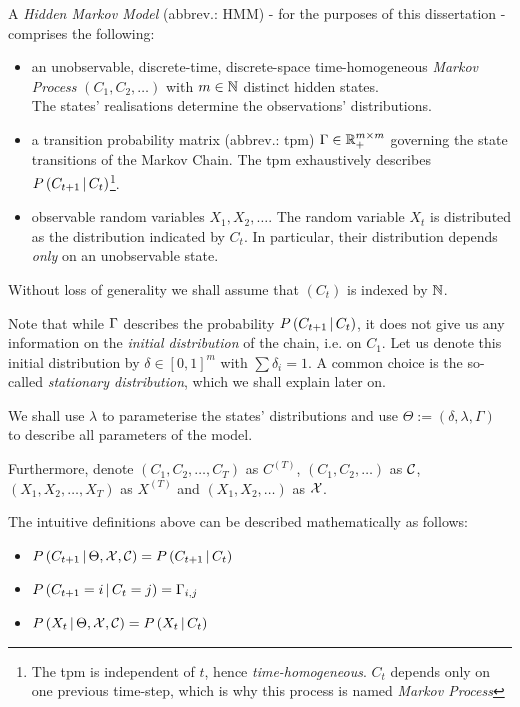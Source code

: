 A \textit{Hidden Markov Model} (abbrev.: HMM) - for the purposes of this dissertation - comprises the following: 
\begin{itemize}
\item an unobservable, discrete-time, discrete-space time-homogeneous \textit{Markov Process} 
$\left(C_1, C_2, \dots \right)$ with $m \in \mathbb{N}$ distinct hidden states.\\
The states' realisations determine the observations' distributions. 

\item a transition probability matrix (abbrev.: tpm) $\Gamma \in \mathbb{R}_+^{m \times m}$ governing the state transitions of the Markov Chain. The tpm exhaustively describes $P\left(C_{t+1} \, | \, C_t\right)$\footnote{The tpm is independent of $t$, hence \textit{time-homogeneous}. $C_t$ depends only on one previous time-step, which is why this process is named \textit{Markov Process}}.  

\item observable random variables $X_1, X_2, \dots$. The random variable $X_t$ is distributed as the distribution indicated by $C_t$. In particular, their distribution depends \textit{only} on an unobservable state. 
\end{itemize}
Without loss of generality we shall assume that $(C_t)$ is indexed by $\mathbb{N}$. 


Note that while $\Gamma$ describes the probability $P\left(C_{t+1} \, | \, C_t\right)$, it does not give us any information on the \textit{initial distribution} of the chain, i.e. on $C_1$. Let us denote this initial distribution by  $\delta \in [0,1]^m$ with $\sum \delta_i = 1$. A common choice is the so-called \textit{stationary distribution}, which we shall explain later on. 

We shall use $\lambda$ to parameterise the states' distributions and use $\Theta := \left(\delta, \lambda, \Gamma \right)$ to describe all parameters of the model.

Furthermore, denote $\left(C_1, C_2, \dots, C_T \right)$ as $C^{(T)}$, $\left(C_1, C_2, \dots \right)$ as $\mathcal{C}$, $\left(X_1, X_2, \dots, X_T \right)$ as $X^{(T)}$ and $\left(X_1, X_2, \dots \right)$ as $\mathcal{X}$. 

The intuitive definitions above can be described mathematically as follows:
\begin{itemize}	
	\item $P\left(C_{t+1} \, | \, \Theta, \mathcal{X}, \mathcal{C}\right) = P\left(C_{t+1} \, | \, C_t\right)$
	
	\item $P\left(C_{t+1} = i \, | \, C_t = j\right) = \Gamma_{i, j} $ 
	
	\item $P\left(X_t \, | \,  \Theta, \mathcal{X}, \mathcal{C}\right) = P\left(X_t \, | \, C_t\right)$
\end{itemize}


